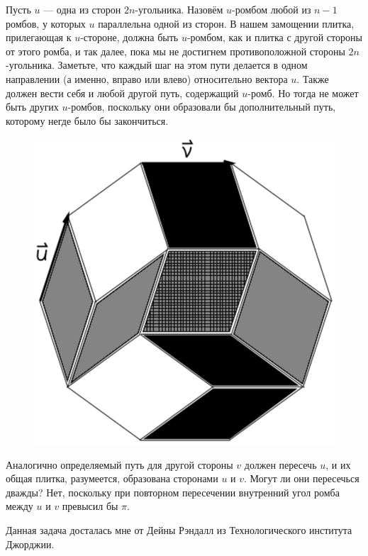 Пусть $u$ --- одна из сторон $2n$-угольника.
Назовём $u$-ромбом любой из $n-1$ ромбов, у которых $u$ параллельна одной из сторон.
В нашем замощении плитка, прилегающая к $u$-стороне, должна быть $u$-ромбом, как и плитка с другой стороны от этого ромба, и так далее, пока мы не достигнем противоположной стороны $2n$-угольника.
Заметьте, что каждый шаг на этом пути делается в одном направлении (а именно, вправо или влево) относительно вектора $u$. 
Также должен вести себя и любой другой путь, содержащий $u$-ромб.
Но тогда не может быть других $u$-ромбов, поскольку они образовали бы дополнительный путь, которому негде было бы закончиться.

\begin{figure}[h!]
\centering
\includegraphics[scale=0.5]{Figs/Geometry/dimers}
\end{figure}

Аналогично определяемый путь для другой стороны $v$ должен пересечь $u$, и их общая плитка, разумеется, образована сторонами $u$ и $v$.
Могут ли они пересечься дважды?
Нет, поскольку при повторном пересечении внутренний угол ромба между $u$ и $v$ превысил бы $\pi$.\heart

Данная задача досталась мне от Дейны Рэндалл из Технологического института Джорджии.

